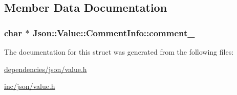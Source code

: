 \subsection{Member Data Documentation}
\hypertarget{structJson_1_1Value_1_1CommentInfo_ac80f716e6784d896c84809f529b17d65}{
\subsubsection[{comment\-\_\-}]{\setlength{\rightskip}{0pt plus 5cm}char $\ast$ Json\-::\-Value\-::\-Comment\-Info\-::comment\-\_\-}}\label{d9/d32/structJson_1_1Value_1_1CommentInfo_ac80f716e6784d896c84809f529b17d65}


The documentation for this struct was generated from the following files\-:\begin{DoxyCompactItemize}
\item 
\hyperlink{dependencies_2json_2value_8h}{dependencies/json/value.\-h}\item 
\hyperlink{inc_2json_2value_8h}{inc/json/value.\-h}\end{DoxyCompactItemize}
